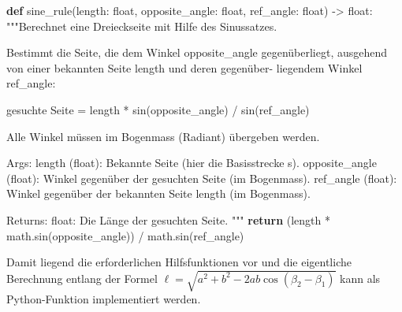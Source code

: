 \documentclass[
  nswissgerman,
  a4paper,
  DIV=11,
  numbers=noendperiod,
  ngerman]{scrreprt}
\newenvironment{Shaded}{\begin{snugshade}}{\end{snugshade}}
\newcommand{\BuiltInTok}[1]{\textcolor[rgb]{0.00,0.23,0.31}{#1}}
\newcommand{\CommentTok}[1]{\textcolor[rgb]{0.37,0.37,0.37}{#1}}
\newcommand{\ControlFlowTok}[1]{\textcolor[rgb]{0.00,0.23,0.31}{\textbf{#1}}}
\newcommand{\KeywordTok}[1]{\textcolor[rgb]{0.00,0.23,0.31}{\textbf{#1}}}
\newcommand{\NormalTok}[1]{\textcolor[rgb]{0.00,0.23,0.31}{#1}}
\newcommand{\OperatorTok}[1]{\textcolor[rgb]{0.37,0.37,0.37}{#1}}
\begin{document}
\begin{Shaded}
\begin{Highlighting}[numbers=left,,]
\KeywordTok{def}\NormalTok{ sine\_rule(length: }\BuiltInTok{float}\NormalTok{, opposite\_angle: }\BuiltInTok{float}\NormalTok{, ref\_angle: }\BuiltInTok{float}\NormalTok{) }\OperatorTok{{-}\textgreater{}} \BuiltInTok{float}\NormalTok{:}
    \CommentTok{"""Berechnet eine Dreieckseite mit Hilfe des Sinussatzes.}

\CommentTok{    Bestimmt die Seite, die dem Winkel \textasciigrave{}\textasciigrave{}opposite\_angle\textasciigrave{}\textasciigrave{} gegenüberliegt,}
\CommentTok{    ausgehend von einer bekannten Seite \textasciigrave{}\textasciigrave{}length\textasciigrave{}\textasciigrave{} und deren gegenüber{-}}
\CommentTok{    liegendem Winkel \textasciigrave{}\textasciigrave{}ref\_angle\textasciigrave{}\textasciigrave{}:}

\CommentTok{        gesuchte Seite = length * sin(opposite\_angle) / sin(ref\_angle)}

\CommentTok{    Alle Winkel müssen im Bogenmass (Radiant) übergeben werden.}

\CommentTok{    Args:}
\CommentTok{        length (float): Bekannte Seite (hier die Basisstrecke s).}
\CommentTok{        opposite\_angle (float): Winkel gegenüber der gesuchten Seite}
\CommentTok{            (im Bogenmass).}
\CommentTok{        ref\_angle (float): Winkel gegenüber der bekannten Seite \textasciigrave{}\textasciigrave{}length\textasciigrave{}\textasciigrave{}}
\CommentTok{            (im Bogenmass).}

\CommentTok{    Returns:}
\CommentTok{        float: Die Länge der gesuchten Seite.}
\CommentTok{    """}
    \ControlFlowTok{return}\NormalTok{ (length }\OperatorTok{*}\NormalTok{ math.sin(opposite\_angle)) }\OperatorTok{/}\NormalTok{ math.sin(ref\_angle)}
\end{Highlighting}
\end{Shaded}

Damit liegend die erforderlichen Hilfsfunktionen vor und die eigentliche
Berechnung entlang der Formel \(\ell =\sqrt{a^2 + b^2 - 2ab
\cos (\beta_2 - \beta_1)}\) kann als Python-Funktion implementiert
werden.
\end{document}
